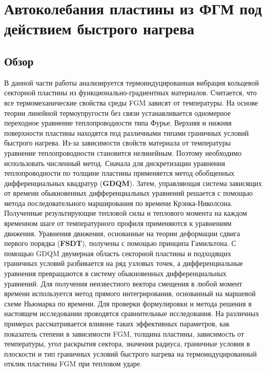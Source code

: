 \section{Автоколебания пластины из ФГМ под действием быстрого нагрева} \label{ch:ch3/sec3}

\subsection{Обзор}\label{ch:ch3/sec3/sub1}
В данной части работы анализируется термоиндуцированная вибрация кольцевой секторной пластины из функционально-градиентных материалов. Считается, что все термомеханические свойства среды FGM зависят от температуры. На основе теории линейной термоупругости без связи устанавливается одномерное переходное уравнение теплопроводности типа Фурье. Верхняя и нижняя поверхности пластины находятся под различными типами граничных условий быстрого нагрева. Из-за зависимости свойств материала от температуры уравнение теплопроводности становится нелинейным. Поэтому необходимо использовать численный метод. Сначала для дискретизации уравнения теплопроводности по толщине пластины применяется метод обобщенных дифференциальных квадратур (\textbf{GDQM}). Затем, управляющая система зависящих от времени обыкновенных дифференциальных уравнений решается с помощью метода последовательного марширования по времени Крэнка-Николсона. Полученные результирующие тепловой силы и теплового момента на каждом временном шаге от температурного профиля применяются к уравнениям движения. Уравнения движения, основанные на теории деформации сдвига первого порядка (\textbf{FSDT}), получены с помощью принципа Гамильтона. С помощью GDQM двумерная область секторной пластины и подходящих граничных условий разбивается на ряд узловых точек, а дифференциальные уравнения превращаются в систему обыкновенных дифференциальных уравнений. Для получения неизвестного вектора смещения в любой момент времени используется метод прямого интегрирования, основанный на маршевой схеме Ньюмарка по времени. Для проверки формулировки и метода решения в настоящем исследовании проводятся сравнительные исследования. На различных примерах рассматривается влияние таких эффективных параметров, как показатель степени в зависимости FGM, толщина пластины, зависимость от температуры, угол раскрытия сектора, значения радиуса, граничные условия в плоскости и тип граничных условий быстрого нагрева на термоиндуцированный отклик пластины FGM при тепловом ударе.


